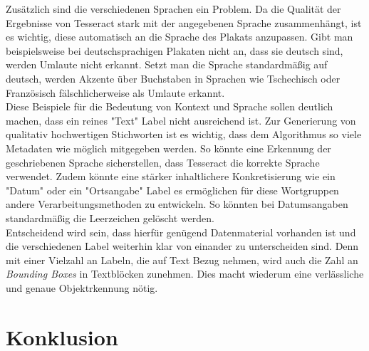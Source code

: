 \documentclass[a4paper,12pt,ngerman]{article}
\begin{document}
Zusätzlich sind die verschiedenen Sprachen ein Problem. Da die Qualität der Ergebnisse von Tesseract stark mit der angegebenen Sprache zusammenhängt, ist es wichtig, diese automatisch an die Sprache des Plakats anzupassen. Gibt man beispielsweise bei deutschsprachigen Plakaten nicht an, dass sie deutsch sind, werden Umlaute nicht erkannt. Setzt man die Sprache standardmäßig auf deutsch, werden Akzente über Buchstaben in Sprachen wie Tschechisch oder Französisch fälschlicherweise als Umlaute erkannt.\\
Diese Beispiele für die Bedeutung von Kontext und Sprache sollen deutlich machen, dass ein reines "Text" Label nicht ausreichend ist. Zur Generierung von qualitativ hochwertigen Stichworten ist es wichtig, dass dem Algorithmus so viele Metadaten wie möglich mitgegeben werden. So könnte eine Erkennung der geschriebenen Sprache sicherstellen, dass Tesseract die korrekte Sprache verwendet. Zudem könnte eine stärker inhaltlichere Konkretisierung wie ein "Datum" oder ein "Ortsangabe" Label es ermöglichen für diese Wortgruppen andere Verarbeitungsmethoden zu entwickeln. So könnten bei Datumsangaben standardmäßig die Leerzeichen gelöscht werden.\\
Entscheidend wird sein, dass hierfür genügend Datenmaterial vorhanden ist und die verschiedenen Label weiterhin klar von einander zu unterscheiden sind. Denn mit einer Vielzahl an Labeln, die auf Text Bezug nehmen, wird auch die Zahl an \textit{Bounding Boxes} in Textblöcken zunehmen. Dies macht wiederum eine verlässliche und genaue Objektrkennung nötig.

\newpage
\section{Konklusion}
\end{document}

